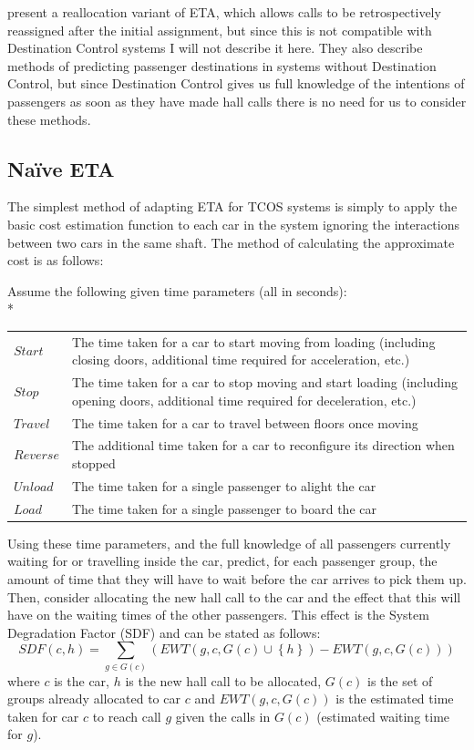 \documentclass{UoYCSproject}
\begin{document}
\citet{Rong2003} present a reallocation variant of ETA, which allows calls to be retrospectively reassigned after the initial assignment, but since this is not compatible with Destination Control systems I will not describe it here.  They also describe methods of predicting passenger destinations in systems without Destination Control, but since Destination Control gives us full knowledge of the intentions of passengers as soon as they have made hall calls there is no need for us to consider these methods.

\subsection{Na\"{i}ve ETA}

The simplest method of adapting ETA for TCOS systems is simply to apply the basic cost estimation function to each car in the system ignoring the interactions between two cars in the same shaft.  The method of calculating the approximate cost is as follows:

Assume the following given time parameters (all in seconds):\\*
\begin{tabularx}{\linewidth}{l X}
	$Start$		& The time taken for a car to start moving from loading (including closing doors, additional time required for acceleration, etc.) \\
	$Stop$		& The time taken for a car to stop moving and start loading (including opening doors, additional time required for deceleration, etc.) \\
	$Travel$	& The time taken for a car to travel between floors once moving \\
	$Reverse$	& The additional time taken for a car to reconfigure its direction when stopped \\
	$Unload$	& The time taken for a single passenger to alight the car \\
	$Load$		& The time taken for a single passenger to board the car
\end{tabularx}

Using these time parameters, and the full knowledge of all passengers currently waiting for or travelling inside the car, predict, for each passenger group, the amount of time that they will have to wait before the car arrives to pick them up.  Then, consider allocating the new hall call to the car and the effect that this will have on the waiting times of the other passengers.  This effect is the System Degradation Factor (SDF) and can be stated as follows:
\[ SDF(c, h) = \sum\limits_{g \in G(c)} (EWT(g, c, G(c) \cup \left\{ h \right\}) - EWT(g, c, G(c)))\]
where $c$ is the car, $h$ is the new hall call to be allocated, $G(c)$ is the set of groups already allocated to car $c$ and $EWT(g,c,G(c))$ is the estimated time taken for car $c$ to reach call $g$ given the calls in $G(c)$ (estimated waiting time for $g$).
\end{document}
